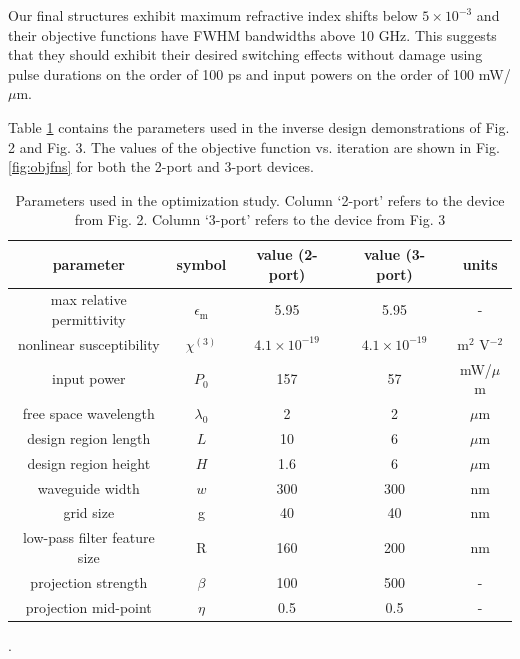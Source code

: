 Our final structures exhibit maximum refractive index shifts below $5\times10^{-3}$ and their objective functions have FWHM bandwidths above 10 GHz.  This suggests that they should exhibit their desired switching effects without damage using pulse durations on the order of 100 ps and input powers on the order of 100 mW/$\mu$m.

Table \ref{tb:params} contains the parameters used in the inverse design demonstrations of Fig. 2 and Fig. 3. The values of the objective function vs. iteration are shown in Fig. \ref{fig:objfns} for both the 2-port and 3-port devices.

\begin{center}
\begin{table}[h]
\begin{tabular}{ |c|c|c|c|c| } 
 \hline
  parameter & symbol & value (2-port) & value (3-port) & units \\ 
  \hline
  \hline
 max relative permittivity & $\epsilon_\textrm{m}$ & 5.95 & 5.95 & - \\ 
 nonlinear susceptibility &  $\chi^{(3)}$ & $4.1\times 10^{-19}$ & $4.1\times 10^{-19}$ & m$^2$ V$^{-2}$ \\ 
 input power & $P_0$ & 157 & 57 & mW/$\mu$m \\
 free space wavelength & $\lambda_0$ & 2 & 2 & $\mu$m \\ 
 design region length & $L$ & 10 & 6 & $\mu \textrm{m}$ \\ 
 design region height & $H$ & 1.6 & 6 & $\mu \textrm{m}$ \\ 
 waveguide width & $w$ & 300 & 300 & $ \textrm{nm}$ \\ 
 grid size & g & 40 & 40 & nm \\
 low-pass filter feature size & R & 160 & 200 & nm \\
 projection strength & $\beta$ & 100 & 500 & - \\
 projection mid-point & $\eta$ & 0.5 & 0.5 & - \\
 \hline
\end{tabular}
\caption{\label{table:params} Parameters used in the optimization study.  Column `2-port' refers to the device from Fig. 2. Column `3-port' refers to the device from Fig. 3}.
\label{tb:params}
\end{table}
\end{center}

